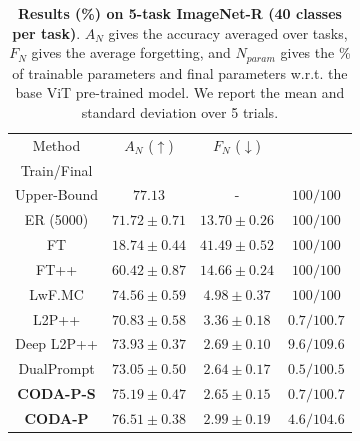 \begin{table}[t]
\caption{\textbf{Results (\%) on 5-task ImageNet-R (40 classes per task)}. $A_N$ gives the accuracy averaged over tasks, $F_N$ gives the average forgetting, and $N_{param}$ gives the \% of trainable parameters and final parameters w.r.t. the base ViT pre-trained model. We report the mean and standard deviation over 5 trials.}
\vspace{-2mm}
\centering
\label{tab_2:imnet-r_5}
\begin{tabular}{c||c|c|c} 
\hline
\rule{0pt}{10pt} Method  & $A_N$ ($\uparrow$) & $F_N$ ($\downarrow$) & \thead{$N_{param}$ ($\downarrow$) \\ Train/Final}\\
\hline
Upper-Bound  & $77.13$ & - & $100/100$  \\ 
\hline
ER (5000)    & $71.72 \pm 0.71$ & $13.70 \pm 0.26$ & $100/100$  \\ 
FT           & $18.74 \pm 0.44$ & $41.49 \pm 0.52$ & $100/100$  \\
FT++         & $60.42 \pm 0.87$ & $14.66 \pm 0.24$ & $100/100$  \\
LwF.MC       & $74.56 \pm 0.59$ & $4.98 \pm 0.37$ & $100/100$  \\ 
L2P++        & $70.83 \pm 0.58$ & $3.36 \pm 0.18$ & $ 0.7/100.7$  \\
Deep L2P++   & $73.93 \pm 0.37$ & $2.69 \pm 0.10$ & $ 9.6/109.6$  \\ 
DualPrompt   & $73.05 \pm 0.50$ & $\bm{2.64 \pm 0.17}$ & $ 0.5/100.5$  \\
\hdashline
\textbf{CODA-P-S}  & $75.19 \pm 0.47$ & $2.65 \pm 0.15$ & $ 0.7/100.7$  \\
\textbf{CODA-P}    & $\bm{76.51 \pm 0.38}$ & $2.99 \pm 0.19$ & $ 4.6/104.6$  \\

\hline
\end{tabular}

\vspace{9mm}


\end{table}
